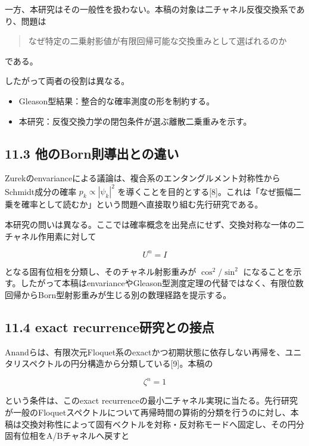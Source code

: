 \documentclass[
  a4paper,
  10pt]{article}
\providecommand{\tightlist}{%
  \setlength{\itemsep}{0pt}\setlength{\parskip}{0pt}}
\begin{document}
一方、本研究はその一般性を扱わない。本稿の対象は二チャネル反復交換系であり、問題は

\begin{quote}
なぜ特定の二乗射影値が有限回帰可能な交換重みとして選ばれるのか
\end{quote}

である。

したがって両者の役割は異なる。

\begin{itemize}
\tightlist
\item
  Gleason型結果：整合的な確率測度の形を制約する。
\item
  本研究：反復交換力学の閉包条件が選ぶ離散二乗重みを示す。
\end{itemize}

\subsection{11.3
他のBorn則導出との違い}\label{113-ux4ed6ux306ebornux5247ux5c0eux51faux3068ux306eux9055ux3044}

Zurekのenvarianceによる議論は、複合系のエンタングルメント対称性からSchmidt成分の確率
\(p_k\propto|\psi_k|^2\)
を導くことを目的とする{[}8{]}。これは「なぜ振幅二乗を確率として読むか」という問題へ直接取り組む先行研究である。

本研究の問いは異なる。ここでは確率概念を出発点にせず、交換対称な一体の二チャネル作用素に対して

\[
U^n=I
\]

となる固有位相を分類し、そのチャネル射影重みが \(\cos^2/\sin^2\)
になることを示す。したがって本稿はenvarianceやGleason型測度定理の代替ではなく、有限位数回帰からBorn型射影重みが生じる別の数理経路を提示する。

\subsection{11.4 exact
recurrence研究との接点}\label{114-exact-recurrenceux7814ux7a76ux3068ux306eux63a5ux70b9}

Anandらは、有限次元Floquet系のexactかつ初期状態に依存しない再帰を、ユニタリスペクトルの円分構造から分類している{[}9{]}。本稿の

\[
\zeta^n=1
\]

という条件は、このexact
recurrenceの最小二チャネル実現に当たる。先行研究が一般のFloquetスペクトルについて再帰時間の算術的分類を行うのに対し、本稿は交換対称性によって固有ベクトルを対称・反対称モードへ固定し、その円分固有位相をA/Bチャネルへ戻すと
\end{document}
